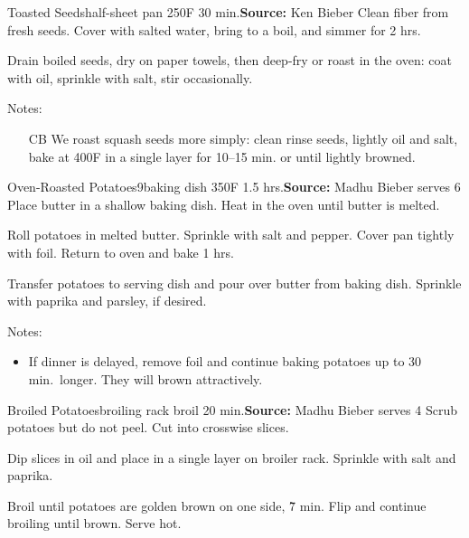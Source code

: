 \begin{recipe}{Toasted Seeds}{half-sheet pan \hfill 250\0F \hfill 30 min.}{\textbf{Source:} Ken Bieber \hfill }
 Clean fiber from fresh seeds. Cover with salted water, bring to a boil, and simmer for 2 hrs.

 \newstep Drain boiled seeds, dry on paper towels, then deep-fry or roast in the oven: coat with oil, sprinkle with salt, stir occasionally.

 \freeform Notes:
 \begin{itemize}
  \item [CB] We roast squash seeds more simply: clean \And rinse seeds, lightly oil and salt, bake at 400\0F in a single layer for 10--15 min. or until lightly browned.
 \end{itemize}
\end{recipe}

\begin{recipe}{Oven-Roasted Potatoes}{9\inch{}\inch baking dish \hfill 350\0F \hfill 1.5 hrs.}{\textbf{Source:} Madhu Bieber \hfill serves 6}
 Place butter in a shallow baking dish. Heat in the oven until butter is melted.

 Roll potatoes in melted butter. Sprinkle with salt and pepper. Cover pan tightly with foil. Return to oven and bake 1 hrs.

 Transfer potatoes to serving dish and pour over butter from baking dish. Sprinkle with paprika and parsley, if desired.

 \freeform Notes:
 \begin{itemize}
  \item If dinner is delayed, remove foil and continue baking potatoes up to 30 min.\ longer. They will brown attractively.
 \end{itemize}
\end{recipe}

\begin{recipe}{Broiled Potatoes}{broiling rack \hfill broil \hfill 20 min.}{\textbf{Source:} Madhu Bieber \hfill serves 4}
 Scrub potatoes but do not peel. Cut into \inch crosswise slices.

 Dip slices in oil and place in a single layer on broiler rack. Sprinkle with salt and paprika.

 \newstep Broil until potatoes are golden brown on one side, \~7 min. Flip and continue broiling until brown. Serve hot.
\end{recipe}

